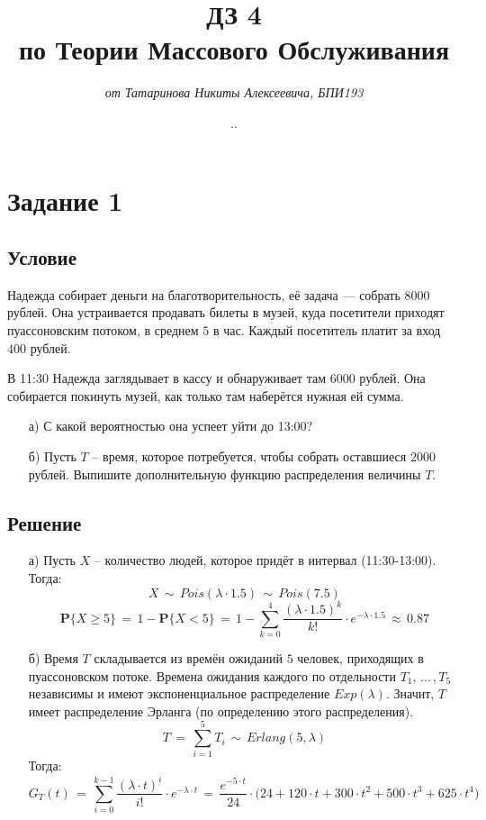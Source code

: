 \documentclass{article}
\title{\textbf{ДЗ 4\\по Теории Массового Обслуживания}}
\author{\textit{от Татаринова Никиты Алексеевича, БПИ193}}
\date{\the\year .\twodigits{\the\month}.\twodigits{\the\day}}
\begin{document}
\maketitle
\section*{Задание 1}
\subsection*{Условие}
Надежда собирает деньги на благотворительность, её задача — собрать $ 8000 $ рублей. Она устраивается продавать билеты в музей, куда посетители приходят пуассоновским потоком, в среднем $ 5 $ в час. Каждый посетитель платит за вход $ 400 $ рублей.\par
В 11:30 Надежда заглядывает в кассу и обнаруживает там $ 6000 $ рублей. Она собирается покинуть музей, как только там наберётся нужная ей сумма.
\begin{enumerate}
\item[а)] С какой вероятностью она успеет уйти до 13:00?
\item[б)] Пусть $ T $ -- время, которое потребуется, чтобы собрать оставшиеся $ 2000 $ рублей. Выпишите дополнительную функцию распределения величины $ T $.
\end{enumerate}
\subsection*{Решение}
\begin{enumerate}
\item[а)] Пусть $ X $ -- количество людей, которое придёт в интервал (11:30-13:00). Тогда:
\[ X \, \sim \, Pois(\lambda \! \cdot \! 1.5) \, \sim \, Pois(7.5) \]
\[ \mathbf{P} \big\{ X \! \geqslant \! 5 \big\} \, = \, 1 \! - \! \mathbf{P} \big\{ X \! < \! 5 \big\} \, = \, 1 \! - \! \sum\limits_{k=0}^4 \dfrac{(\lambda \! \cdot \! 1.5)^k}{k!} \! \cdot \! e^{-\lambda \cdot 1.5} \, \approx \, 0.87 \]
\item[б)] Время $ T $ складывается из времён ожиданий $ 5 $ человек, приходящих в пуассоновском потоке. Времена ожидания каждого по отдельности $ T_1, \, ... \, ,T_5 $ независимы и имеют экспоненциальное распределение $ Exp(\lambda) $. Значит, $ T $ имеет распределение Эрланга (по определению этого распределения).
\[ T \, = \, \sum\limits_{i=1}^5 T_i \, \sim \, Erlang(5,\lambda ) \]
Тогда:
\[ G_T(t) \, = \, \sum\limits_{i=0}^{k-1} \dfrac{(\lambda \! \cdot \! t)^i}{i!} \! \cdot \! e^{-\lambda \cdot t} \, = \, \dfrac{e^{-5 \cdot t}}{24} \! \cdot \! \big( 24 \! + \! 120 \! \cdot \! t \! + \! 300 \! \cdot \! t^2 \! + \! 500 \! \cdot \! t^3 \! + \! 625 \! \cdot \! t^4 \big) \]
\end{enumerate}
\end{document}
